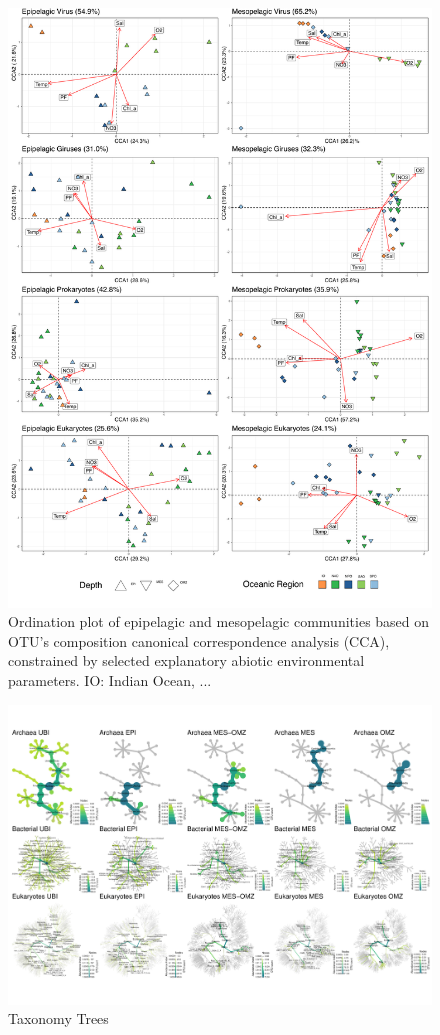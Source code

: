 \documentclass[fleqn,10pt]{wlscirep}
\begin{document}
\begin{figure}[ht]
    \centering
    \includegraphics[scale=0.285]{images/custom_cca_plot_hellinger_no_bathy_labels_OS_regions_colors_to_print.pdf}
    \caption{Ordination plot of epipelagic and mesopelagic communities based on OTU’s composition canonical correspondence analysis (CCA), constrained by selected explanatory abiotic environmental parameters. IO: Indian Ocean, ...}
    \label{fig:cca_OS}
\end{figure}
\clearpage
\begin{figure}[ht]
    \centering
    \includegraphics[scale=0.7,angle=90,origin=c]{images/hmap_general_pub.pdf}
    \caption{Taxonomy Trees}
    \label{fig:tax_trees}
\end{figure}
\end{document}
